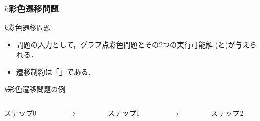 \documentclass[dvipdfmx,11pt]{beamer}
\begin{document}
\begin{frame}\frametitle{$k$彩色遷移問題}

  \begin{block}{$k$彩色遷移問題}
    \begin{itemize}
    \item 問題の入力として，グラフ点彩色問題とその2つの実行可能解
          (と)が与えられる．
    \item 遷移制約は「」である．
    \end{itemize}
  \end{block}

  \begin{exampleblock}{$k$彩色遷移問題の例}
    \begin{columns}
      \begin{column}{0.3\textwidth}
        \centering
        
        ステップ0
      \end{column}
      \begin{column}{0.05\textwidth}
        \textbf{$\longrightarrow$}
      \end{column}
      \begin{column}[]{0.3\textwidth}
        \centering
        
        ステップ1
      \end{column}
      \begin{column}{0.05\textwidth}
        \textbf{$\longrightarrow$}
      \end{column}
      \begin{column}{0.3\textwidth}
        \centering
        
        ステップ2
      \end{column}
    \end{columns}
  \end{exampleblock}
  
\end{frame}
\end{document}
